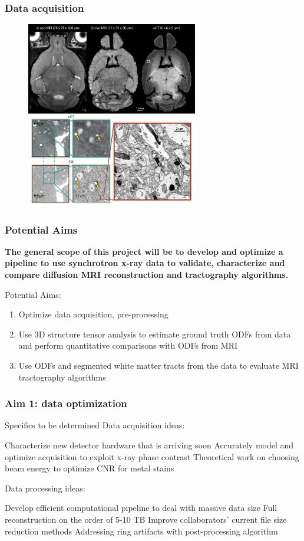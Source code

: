 \documentclass[presentation, 10pt]{beamer}
\begin{document}
\begin{frame}
  \frametitle{Data acquisition}
  \begin{figure}[h]
    \centering
    \includegraphics[width=7.5cm]{figs/grant_multi_scale}
  \end{figure}
\end{frame}

\begin{frame}
  \frametitle{Potential Aims}
  \textbf{The general scope of this project will be to develop and optimize a
    pipeline to use synchrotron x-ray \bolduct data to validate, characterize
    and compare diffusion MRI reconstruction and tractography
    algorithms.}\newline

  Potential Aims:
  \begin{enumerate}
    \item Optimize \uct data acquisition, pre-processing
    \item Use 3D structure tensor analysis to estimate ground truth ODFs from
      \uct data and perform quantitative comparisons with ODFs from MRI
    \item Use ODFs and segmented white matter tracts from the \uct data to
      evaluate MRI tractography algorithms
  \end{enumerate}
\end{frame}

\begin{frame}
  \frametitle{Aim 1: \bolduct data optimization}
  \begin{outline}
    \1 Specifics to be determined
    \1 Data acquisition ideas:

    \2 Characterize new detector hardware that is arriving soon
    \2 Accurately model and optimize acquisition to exploit x-ray phase contrast
    \2 Theoretical work on choosing beam energy to optimize CNR for metal stains
    
    \1 Data processing ideas:
    
    \2 Develop efficient computational pipeline to deal with massive data size
    \3 Full reconstruction on the order of 5-10 TB
    \3 Improve collaborators' current file size reduction methods
    \2 Addressing ring artifacts with post-processing algorithm\cite{Prell2009}
  \end{outline}
\end{frame}
\end{document}
